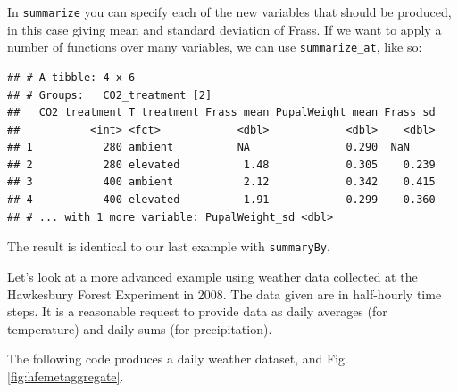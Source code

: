 \documentclass[]{book}
\newenvironment{Shaded}{\begin{snugshade}}{\end{snugshade}}
\newcommand{\DataTypeTok}[1]{\textcolor[rgb]{0.13,0.29,0.53}{#1}}
\newcommand{\KeywordTok}[1]{\textcolor[rgb]{0.13,0.29,0.53}{\textbf{#1}}}
\newcommand{\NormalTok}[1]{#1}
\newcommand{\OperatorTok}[1]{\textcolor[rgb]{0.81,0.36,0.00}{\textbf{#1}}}
\newcommand{\StringTok}[1]{\textcolor[rgb]{0.31,0.60,0.02}{#1}}
\begin{document}
In \texttt{summarize} you can specify each of the new variables that should be produced, in this case giving mean and standard deviation of Frass. If we want to apply a number of functions over many variables, we can use \texttt{summarize\_at}, like so:

\begin{Shaded}
\end{Shaded}

\begin{verbatim}
## # A tibble: 4 x 6
## # Groups:   CO2_treatment [2]
##   CO2_treatment T_treatment Frass_mean PupalWeight_mean Frass_sd
##           <int> <fct>            <dbl>            <dbl>    <dbl>
## 1           280 ambient          NA               0.290  NaN    
## 2           280 elevated          1.48            0.305    0.239
## 3           400 ambient           2.12            0.342    0.415
## 4           400 elevated          1.91            0.299    0.360
## # ... with 1 more variable: PupalWeight_sd <dbl>
\end{verbatim}

The result is identical to our last example with \texttt{summaryBy}.

Let's look at a more advanced example using weather data collected at the Hawkesbury Forest Experiment in 2008. The data given are in half-hourly time steps. It is a reasonable request to provide data as daily averages (for temperature) and daily sums (for precipitation).

The following code produces a daily weather dataset, and Fig. \ref{fig:hfemetaggregate}.
\end{document}
